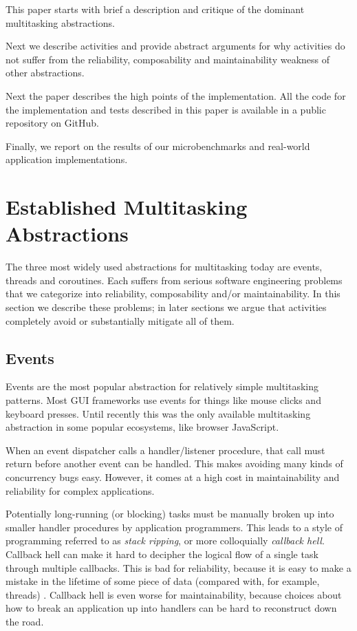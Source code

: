 \documentclass[10pt,preprint]{sigplanconf}
\begin{document}
This paper starts with brief a description and critique of the dominant multitasking abstractions.

Next we describe activities and provide abstract arguments for why activities do not suffer from the reliability, composability and maintainability weakness of other abstractions.

Next the paper describes the high points of the \charcoal{} implementation.
All the code for the implementation and tests described in this paper is available in a public repository on GitHub.

Finally, we report on the results of our microbenchmarks and real-world application implementations.

\section{Established Multitasking Abstractions}

The three most widely used abstractions for multitasking today are events, threads and coroutines.
Each suffers from serious software engineering problems that we categorize into reliability, composability and/or maintainability.
In this section we describe these problems; in later sections we argue that activities completely avoid or substantially mitigate all of them.

\subsection{Events}

Events are the most popular abstraction for relatively simple multitasking patterns.
Most GUI frameworks use events for things like mouse clicks and keyboard presses.
Until recently this was the only available multitasking abstraction in some popular ecosystems, like browser JavaScript.

When an event dispatcher calls a handler/listener procedure, that call must return before another event can be handled.
This makes avoiding many kinds of concurrency bugs easy.
However, it comes at a high cost in maintainability and reliability for complex applications.

Potentially long-running (or blocking) tasks must be manually broken up into smaller handler procedures by application programmers.
This leads to a style of programming referred to as \emph{stack ripping}\cite{Adya2002}, or more colloquially \emph{callback hell}.
Callback hell can make it hard to decipher the logical flow of a single task through multiple callbacks.
This is bad for reliability, because it is easy to make a mistake in the lifetime of some piece of data (compared with, for example, threads) \cite{Behren2003a}.
Callback hell is even worse for maintainability, because choices about how to break an application up into handlers can be hard to reconstruct down the road.
\end{document}
